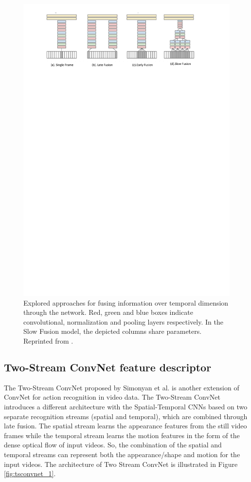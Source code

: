 \begin{figure}
	\includegraphics[trim=2cm 23cm 0cm 1cm]{figs/STCNNs.pdf}
	\caption{Explored approaches for fusing information over
		temporal dimension through the network. Red, green and
		blue boxes indicate convolutional, normalization and pooling
		layers respectively. In the Slow Fusion model, the depicted
		columns share parameters. Reprinted from \cite{karpathy2014}.}
	\label{fig:STCNNs}
\end{figure}

\subsection{Two-Stream ConvNet feature descriptor}
\label{2_3_2}
The Two-Stream ConvNet proposed by Simonyan et al. \cite{simonyan2014} is another extension of ConvNet for action recognition in video data. The Two-Stream ConvNet introduces a different architecture with the Spatial-Temporal CNNs \cite{karpathy2014} based on two separate recognition streams (spatial and temporal), which are combined through late fusion. The spatial stream learns the appearance features from the still video frames while the temporal stream learns the motion features in the form of the dense optical flow of input videos. So, the combination of the spatial and temporal streams can represent both the appearance/shape and motion for the input videos. The architecture of Two Stream ConvNet is illustrated in Figure \ref{fig:tsconvnet_1}.

